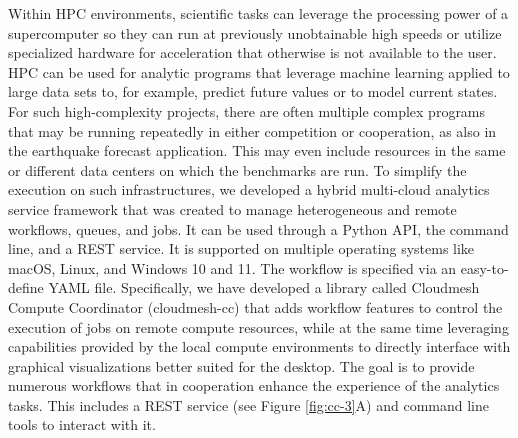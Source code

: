 Within HPC environments, scientific tasks can leverage the processing power of a supercomputer so they can run at previously unobtainable high speeds or utilize specialized hardware for acceleration that otherwise is not available to the user. HPC can be used for analytic programs that leverage machine learning applied to large data sets to, for example, predict future values or to model current states. For such high-complexity projects, there are often multiple complex programs that may be running repeatedly in either competition or cooperation, as also in the earthquake forecast application.  This may even include resources in the same or different data centers on which the benchmarks are run. To simplify the execution on such infrastructures, we developed a hybrid multi-cloud analytics service framework that was created to manage heterogeneous and remote workflows, queues, and jobs.  It can be used through a Python API, the command line, and a REST service. It is supported on multiple operating systems like macOS, Linux, and Windows 10 and 11.  The workflow is specified via an easy-to-define YAML file.  Specifically, we have developed a library called Cloudmesh Compute Coordinator (cloudmesh-cc) \citep{las-22-arxiv-workflow-cc} that adds workflow features to control the execution of jobs on remote compute resources, while at the same time leveraging capabilities provided by the local compute environments to directly interface with graphical visualizations better suited for the desktop. The goal is to provide numerous workflows that in cooperation enhance the experience of the analytics tasks. This includes a REST service (see Figure \ref{fig:cc-3}A) and command line tools to interact with it.


